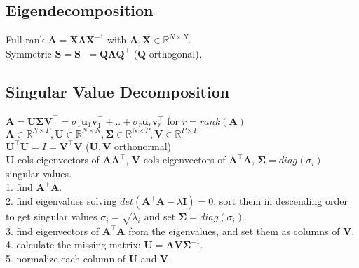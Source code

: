 \subsection*{Eigendecomposition}
Full rank $\mathbf{A} = \mathbf{X} \boldsymbol{\Lambda} \mathbf{X}^{-1}$ with $\mathbf{A, X} \in \mathbb{R}^{N \times N}$.\\
Symmetric $\mathbf{S} = \mathbf{S}^\top = \mathbf{Q} \boldsymbol{\Lambda} \mathbf{Q^\top}$ ($\mathbf{Q}$ orthogonal).

\subsection*{Singular Value Decomposition}
$\mathbf{A} = \mathbf{U} \mathbf{\Sigma} \mathbf{V}^\top = \sigma_{1} \mathbf{u}_1 \mathbf{v}_1^\top+..+\sigma_{r} \mathbf{u}_r \mathbf{v}_r^\top$ for $r=rank(\mathbf{A})$\\
$\mathbf{A} \in \mathbb{R}^{N \times P}, \mathbf{U} \in \mathbb{R}^{N \times N}, \mathbf{\Sigma} \in \mathbb{R}^{N \times P}, \mathbf{V} \in \mathbb{R}^{P \times P}$\\
$\mathbf{U}^\top \mathbf{U} = I = \mathbf{V}^\top \mathbf{V}$ ($\mathbf{U}, \mathbf{V}$ orthonormal)\\
$\mathbf{U}$ cols eigenvectors of $\mathbf{A} \mathbf{A}^\top$, $\mathbf{V}$ cols eigenvectors of $\mathbf{A}^\top \mathbf{A}$, $\mathbf{\Sigma} = diag(\sigma_i)$ singular values.\\
1. find $\mathbf{A}^\top \mathbf{A}$.\\
2. find eigenvalues solving $ det(\mathbf{A}^\top\mathbf{A}-\lambda\mathbf{I}) = 0$, sort them in descending order to get singular values $\sigma_i = \sqrt{\lambda_i}$ and set $\mathbf{\Sigma} = diag(\sigma_i)$.\\
3. find eigenvectors of $\mathbf{A}^\top \mathbf{A}$ from the eigenvalues, and set them as columns of $\mathbf{V}$.\\
4. calculate the missing matrix: $\mathbf{U} = \mathbf{A} \mathbf{V} \mathbf{\Sigma}^{-1}$.\\
5. normalize each column of $\mathbf{U}$ and $\mathbf{V}$.
